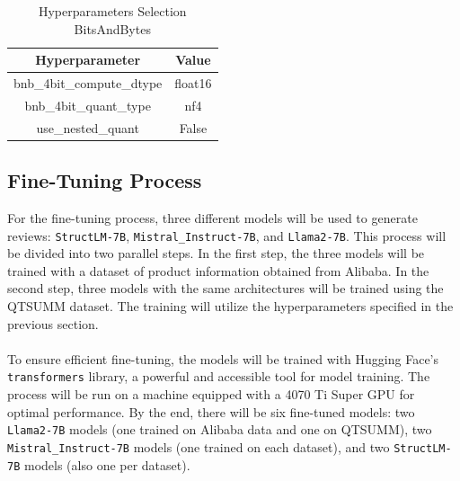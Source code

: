 \begin{table}[H]
    \centering
    \begin{tabular}{|c|c|}
        \hline
        \textbf{Hyperparameter} & \textbf{Value} \\
        \hline
        bnb\_4bit\_compute\_dtype & float16 \\
        bnb\_4bit\_quant\_type & nf4 \\
        use\_nested\_quant & False \\
        \hline
    \end{tabular}
    \caption{Hyperparameters Selection BitsAndBytes}
    \label{table:hyperparameters-bitsandbytes}
\end{table}

\subsection{Fine-Tuning Process}
For the fine-tuning process, three different models will be used to generate reviews: \texttt{StructLM-7B}, \texttt{Mistral\_Instruct-7B}, and \texttt{Llama2-7B}. This process will be divided into two parallel steps. In the first step, the three models will be trained with a dataset of product information obtained from Alibaba. In the second step, three models with the same architectures will be trained using the QTSUMM dataset. The training will utilize the hyperparameters specified in the previous section.
\\\\
To ensure efficient fine-tuning, the models will be trained with Hugging Face's \texttt{transformers} library, a powerful and accessible tool for model training. The process will be run on a machine equipped with a 4070 Ti Super GPU for optimal performance. By the end, there will be six fine-tuned models: two \texttt{Llama2-7B} models (one trained on Alibaba data and one on QTSUMM), two \texttt{Mistral\_Instruct-7B} models (one trained on each dataset), and two \texttt{StructLM-7B} models (also one per dataset).

